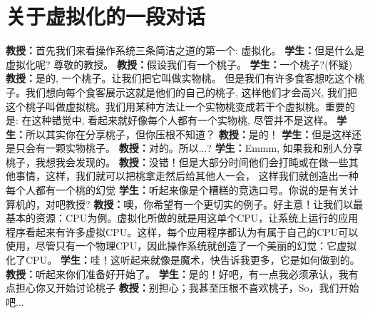 \chapter{关于虚拟化的一段对话}
\thispagestyle{empty}

\textbf{教授：}首先我们来看操作系统三条简洁之道的第一个: 虚拟化。\newline
\textbf{学生：}但是什么是虚拟化呢? 尊敬的教授。\newline
\textbf{教授：}假设我们有一个桃子。\newline
\textbf{学生：}一个桃子?(怀疑)\newline
\textbf{教授：}是的, 一个桃子。让我们把它叫做实物桃。 但是我们有许多食客想吃这个桃子。我们想向每个食客展示这就是他们的自己的桃子, 这样他们才会高兴, 我们把这个桃子叫做虚拟桃。我们用某种方法让一个实物桃变成若干个虚拟桃。重要的是: 在这种错觉中, 看起来就好像每个人都有一个实物桃, 尽管并不是这样。\newline
\textbf{学生：}所以其实你在分享桃子，但你压根不知道？\newline
\textbf{教授：}是的！\newline
\textbf{学生：}但是这样还是只会有一颗实物桃子。\newline
\textbf{教授：}对的。所以...?\newline
\textbf{学生：}Emmm, 如果我和别人分享桃子，我想我会发现的。\newline
\textbf{教授：}没错！但是大部分时间他们会打盹或在做一些其他事情，这样，我们就可以把桃拿走然后给其他人一会， 这样我们就创造出一种每个人都有一个桃的幻觉\newline
\textbf{学生：}听起来像是个糟糕的竞选口号。你说的是有关计算机的，对吧教授?\newline
\textbf{教授：}噢，你希望有一个更切实的例子。好主意！让我们以最基本的资源：CPU为例。虚拟化所做的就是用这单个CPU，让系统上运行的应用程序看起来有许多虚拟CPU。这样，每个应用程序都认为有属于自己的CPU可以使用，尽管只有一个物理CPU，因此操作系统就创造了一个美丽的幻觉：它虚拟化了CPU。\newline
\textbf{学生：}哇！这听起来就像是魔术，快告诉我更多，它是如何做到的。\newline
\textbf{教授：}听起来你们准备好开始了。\newline
\textbf{学生：}是的！好吧，有一点我必须承认，我有点担心你又开始讨论桃子\newline
\textbf{教授：}别担心；我甚至压根不喜欢桃子，So，我们开始吧...\newline